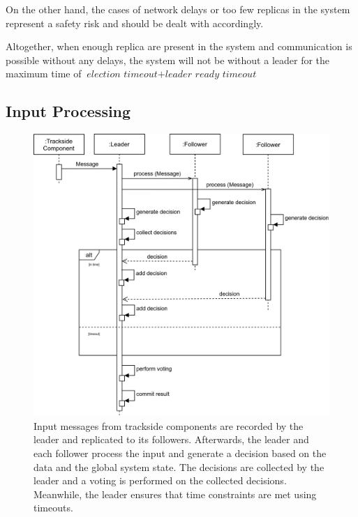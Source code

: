 On the other hand, the cases of network delays or too few replicas in the system represent a safety risk and should be dealt with accordingly.

Altogether, when enough replica are present in the system and communication is possible without any delays, the system will not be without a leader for the maximum time of $\textit{election timeout} + \textit{leader ready timeout}$


\subsection{Input Processing}
\begin{figure}[!hb]
	\centering
	\includegraphics[width=0.75\linewidth]{images/sequence/CollectResults}
	\caption{Input messages from trackside components are recorded by the leader and replicated to its followers. Afterwards, the leader and each follower process the input and generate a decision based on the data and the global system state. The decisions are collected by the leader and a voting is performed on the collected decisions. Meanwhile, the leader ensures that time constraints are met using timeouts.}
	\label{fig:SeqCollectResults}
\end{figure}

